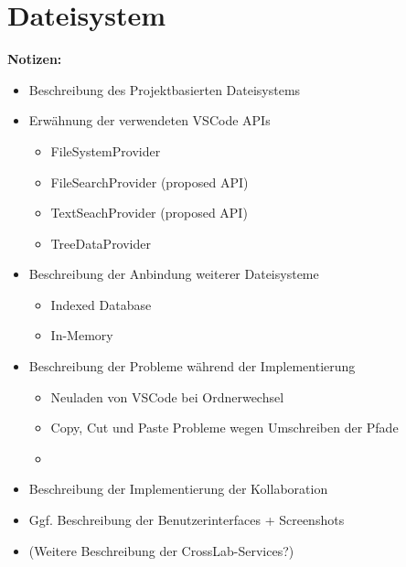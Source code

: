 \section{Dateisystem}\label{section:prototypische-implementierung:dateisystem}

\begin{note}
    \textbf{Notizen:}
    \begin{itemize}
        \item Beschreibung des Projektbasierten Dateisystems
        \item Erwähnung der verwendeten VSCode APIs
              \begin{itemize}
                  \item FileSystemProvider
                  \item FileSearchProvider (proposed API)
                  \item TextSeachProvider (proposed API)
                  \item TreeDataProvider
              \end{itemize}
        \item Beschreibung der Anbindung weiterer Dateisysteme
              \begin{itemize}
                  \item Indexed Database
                  \item In-Memory
              \end{itemize}
        \item Beschreibung der Probleme während der Implementierung
              \begin{itemize}
                  \item Neuladen von VSCode bei Ordnerwechsel
                  \item Copy, Cut und Paste Probleme wegen Umschreiben der Pfade
                  \item
              \end{itemize}
        \item Beschreibung der Implementierung der Kollaboration
        \item Ggf. Beschreibung der Benutzerinterfaces + Screenshots
        \item (Weitere Beschreibung der CrossLab-Services?)
    \end{itemize}
\end{note}

